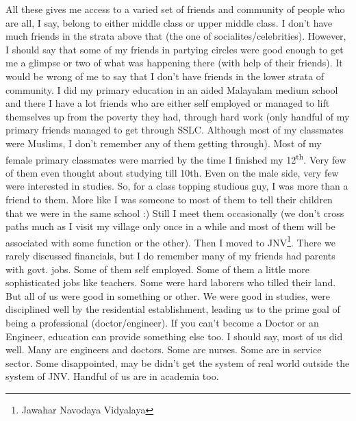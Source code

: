 All these gives me access to a varied set of friends and community of people who are all, I say, 
belong to either middle class or upper middle class. I don't have much friends in the strata above 
that (the one of socialites/celebrities). However, I should say that some of my friends in partying circles 
were good enough to get me a glimpse or two of what was happening there (with help of their friends). 
It would be wrong of me to say that I don't have friends in the lower strata of community. I did my primary education 
in an aided Malayalam medium school and there I have a lot friends who are either self employed 
or managed to lift themselves up from the poverty they had, through hard work (only handful of my 
primary friends managed to get through SSLC. Although most of my classmates were Muslims, I don't 
remember any of them getting through). Most of my female primary classmates were married by the time 
I finished my 12\textsuperscript{th}. Very few of them even thought about studying till 10th. Even on the male side, 
very few were interested in studies. So, for a class topping studious guy, I was more than a friend 
to them. More like I was someone to most of them to tell their children that we were in the same school :) Still 
I meet them occasionally (we don't cross paths much as I visit my village only once in a while 
and most of them will be associated with some function or the other). Then I moved to JNV\footnote{Jawahar Navodaya Vidyalaya}. There we rarely discussed financials, but I do remember many of my friends had
parents with govt. jobs. Some of them self employed. Some of them a little more sophisticated jobs
like teachers. Some were hard laborers who tilled their land. But all of us were good in something 
or other. We were good in
studies, were disciplined well by the residential establishment, leading us to the prime goal of 
being a professional (doctor/engineer). If you can't become a Doctor or an Engineer, education can provide something else too. I should say, most of us did well. Many are engineers and doctors. Some are nurses. 
Some are in service sector. Some disappointed, may be didn't get the system of real world outside 
the system of JNV. Handful of us are in academia too. 

